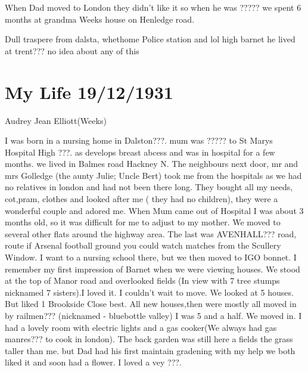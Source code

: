 \documentclass[a4paper]{report}
\begin{document}
When Dad moved to London they didn't like it so when he was ????? we spent 6 months at grandma Weeks house on Henledge road.

Dull traspere from dalsta, whethome Police station and lol high barnet he lived at trent??? no idea about any of this

\chapter{My Life 19/12/1931}
Audrey Jean Elliott(Weeks)

I was born in a nursing home in Dalston???. mum was ????? to St Marys Hospital High ???. as develops breast abcess and was in hospital for a few months. we lived in Balmes road Hackney N.
The neighbours next door, mr and mrs Golledge (the aunty Julie; Uncle Bert) took me from the hospitals as we had no relatives in london and had not been there long. They bought all my needs, cot,pram, clothes and looked after me ( they had no children), they were a wonderful couple and adored me.
When Mum came out of Hospital I was about 3 months old, so it was difficult for me to adjust to my mother.
We moved to several other flats around the highway area. The last was AVENHALL??? road, route if Arsenal football ground you could watch matches from the Scullery Window.
I want to a nursing school there, but we then moved to IGO bonnet.
I remember my first impression of Barnet when we were viewing houses.
We stood at the top of Manor road and overlooked fields (In view with 7 tree stumps nicknamed 7 sisters).I loved it. I couldn't wait to move. We looked at 5 houses. But liked 1 Brookside Close best. All new houses,then were mostly all moved in by railmen??? (nicknamed - bluebottle valley) I was 5 and a half. We moved in. I had a lovely room with electric lights and a gas cooker(We always had gas manres??? to cook in london). The back garden was still here a fields the grass taller than me. but Dad had his first maintain gradening with my help we both liked it and soon had a flower. I loved a vey ???.
\end{document}
